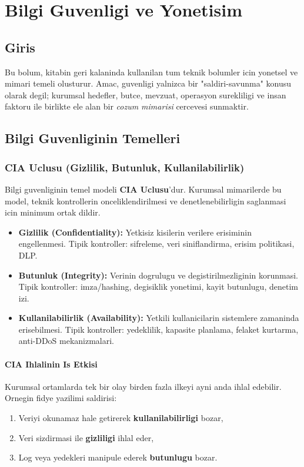 ﻿\chapter{Bilgi Guvenligi ve Yonetisim}

\section*{Giris}
Bu bolum, kitabin geri kalaninda kullanilan tum teknik bolumler icin yonetsel ve mimari temeli olusturur.
Amac, guvenligi yalnizca bir "saldiri-savunma" konusu olarak degil; kurumsal hedefler, butce, mevzuat,
operasyon surekliligi ve insan faktoru ile birlikte ele alan bir \textit{cozum mimarisi} cercevesi sunmaktir.


\section{Bilgi Guvenliginin Temelleri}

\subsection{CIA Uclusu (Gizlilik, Butunluk, Kullanilabilirlik)}
Bilgi guvenliginin temel modeli \textbf{CIA Uclusu}'dur. Kurumsal mimarilerde bu model, teknik kontrollerin
onceliklendirilmesi ve denetlenebilirligin saglanmasi icin minimum ortak dildir.

\begin{itemize}
    \item \textbf{Gizlilik (Confidentiality):} Yetkisiz kisilerin verilere erisiminin engellenmesi.
    Tipik kontroller: sifreleme, veri siniflandirma, erisim politikasi, DLP.
    \item \textbf{Butunluk (Integrity):} Verinin dogrulugu ve degistirilmezliginin korunmasi.
    Tipik kontroller: imza/hashing, degisiklik yonetimi, kayit butunlugu, denetim izi.
    \item \textbf{Kullanilabilirlik (Availability):} Yetkili kullanicilarin sistemlere zamaninda erisebilmesi.
    Tipik kontroller: yedeklilik, kapasite planlama, felaket kurtarma, anti-DDoS mekanizmalari.
\end{itemize}

\subsubsection{CIA Ihlalinin Is Etkisi}
Kurumsal ortamlarda tek bir olay birden fazla ilkeyi ayni anda ihlal edebilir.
Ornegin fidye yazilimi saldirisi:
\begin{enumerate}
    \item Veriyi okunamaz hale getirerek \textbf{kullanilabilirligi} bozar,
    \item Veri sizdirmasi ile \textbf{gizliligi} ihlal eder,
    \item Log veya yedekleri manipule ederek \textbf{butunlugu} bozar.
\end{enumerate}

